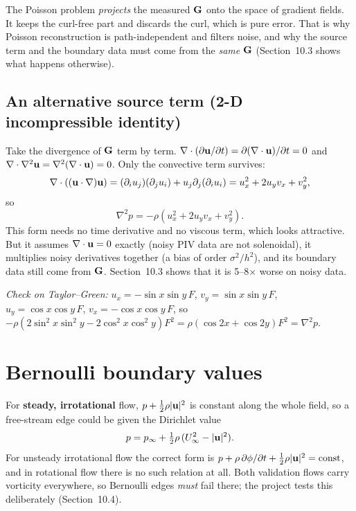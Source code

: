 \begin{keyidea}
The Poisson problem \emph{projects} the measured $\mathbf{G}$ onto the space of gradient fields. It keeps the curl-free part and discards the curl, which is pure error. That is why Poisson reconstruction is path-independent and filters noise, and why the source term and the boundary data must come from the \emph{same} $\mathbf{G}$ (Section~10.3 shows what happens otherwise).
\end{keyidea}

\subsection{An alternative source term (2-D incompressible identity)}
Take the divergence of $\mathbf{G}$ term by term. $\nabla\cdot(\partial\mathbf{u}/\partial t)=\partial(\nabla\cdot\mathbf{u})/\partial t=0$ and $\nabla\cdot\nabla^2\mathbf{u}=\nabla^2(\nabla\cdot\mathbf{u})=0$. Only the convective term survives:
\begin{equation}
\nabla\cdot((\mathbf{u}\cdot\nabla)\mathbf{u})=(\partial_iu_j)(\partial_ju_i)+u_j\partial_j(\partial_iu_i)=u_x^2+2u_yv_x+v_y^2,
\end{equation}
so
\begin{equation}
\nabla^2p=-\rho\left(u_x^2+2u_yv_x+v_y^2\right).
\end{equation}
This form needs no time derivative and no viscous term, which looks attractive. But it assumes $\nabla\cdot\mathbf{u}=0$ exactly (noisy PIV data are not solenoidal), it multiplies noisy derivatives together (a bias of order $\sigma^2/h^2$), and its boundary data still come from $\mathbf{G}$. Section~10.3 shows that it is 5--8$\times$ worse on noisy data.

\textit{Check on Taylor--Green:} $u_x=-\sin x\sin y\,F$, $v_y=\sin x\sin y\,F$, $u_y=\cos x\cos y\,F$, $v_x=-\cos x\cos y\,F$, so $-\rho(2\sin^2x\sin^2y-2\cos^2x\cos^2y)F^2=\rho(\cos2x+\cos2y)F^2=\nabla^2p$. \checkmark

\section{Bernoulli boundary values}
For \textbf{steady, irrotational} flow, $p+\tfrac12\rho|\mathbf{u}|^2$ is constant along the whole field, so a free-stream edge could be given the Dirichlet value
\begin{equation}
p=p_\infty+\tfrac12\rho\,(U_\infty^2-|\mathbf{u}|^2).
\end{equation}
For unsteady irrotational flow the correct form is $p+\rho\,\partial\phi/\partial t+\tfrac12\rho|\mathbf{u}|^2=\text{const}$, and in rotational flow there is no such relation at all. Both validation flows carry vorticity everywhere, so Bernoulli edges \emph{must} fail there; the project tests this deliberately (Section~10.4).

